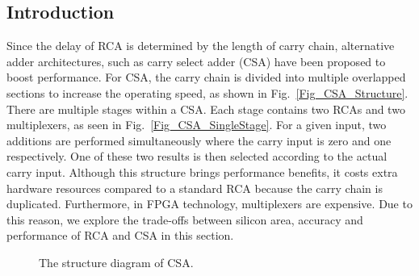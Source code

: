 \documentclass[prodmode,acmtrets]{acmsmall} %
\begin{document}
\subsection{Introduction}
Since the delay of RCA is determined by the length of carry chain, alternative adder architectures, such as carry select adder (CSA) have been proposed to boost performance. For CSA, the carry chain is divided into multiple overlapped sections to increase the operating speed, as shown in Fig.~\ref{Fig_CSA_Structure}. There are multiple stages within a CSA. Each stage contains two RCAs and two multiplexers, as seen in Fig.~\ref{Fig_CSA_SingleStage}. For a given input, two additions are performed simultaneously where the carry input is zero and one respectively. One of these two results is then selected according to the actual carry input. Although this structure brings performance benefits, it costs extra hardware resources compared to a standard RCA because the carry chain is duplicated. Furthermore, in FPGA technology, multiplexers are expensive. Due to this reason, we explore the trade-offs between silicon area, accuracy and performance of RCA and CSA in this section.
\begin{figure}[htbp]
        \centering
    \caption{The structure diagram of CSA.}
\end{figure}
\end{document}
